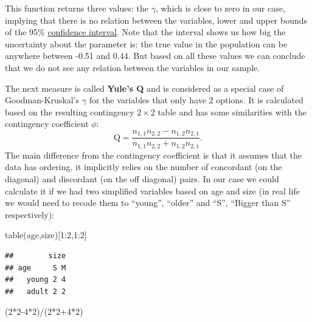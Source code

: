 \documentclass[
]{book}
\newenvironment{Shaded}{\begin{snugshade}}{\end{snugshade}}
\newcommand{\DecValTok}[1]{\textcolor[rgb]{0.00,0.00,0.81}{#1}}
\newcommand{\FunctionTok}[1]{\textcolor[rgb]{0.00,0.00,0.00}{#1}}
\newcommand{\NormalTok}[1]{#1}
\newcommand{\SpecialCharTok}[1]{\textcolor[rgb]{0.00,0.00,0.00}{#1}}
\theoremstyle{definition}
\theoremstyle{definition}
\theoremstyle{definition}
\theoremstyle{definition}
\theoremstyle{remark}
\begin{document}
This function returns three values: the \(\gamma\), which is close to zero in our case, implying that there is no relation between the variables, lower and upper bounds of the 95\% \protect\hyperlink{confidenceIntervals}{confidence interval}. Note that the interval shows us how big the uncertainty about the parameter is: the true value in the population can be anywhere between -0.51 and 0.44. But based on all these values we can conclude that we do not see any relation between the variables in our sample.

The next measure is called \textbf{Yule's Q} and is considered as a special case of Goodman-Kruskal's \(\gamma\) for the variables that only have 2 options. It is calculated based on the resulting contingency \(2\times 2\) table and has some similarities with the contingency coefficient \(\phi\):
\begin{equation}
    \mathrm{Q} = \frac{n_{1,1} n_{2,2} - n_{1,2} n_{2,1}}{n_{1,1} n_{2,2} + n_{1,2} n_{2,1}} .
    \label{eq:measuresAssociationYule}
\end{equation}
The main difference from the contingency coefficient is that it assumes that the data has ordering, it implicitly relies on the number of concordant (on the diagonal) and discordant (on the off diagonal) pairs. In our case we could calculate it if we had two simplified variables based on age and size (in real life we would need to recode them to ``young'', ``older'' and ``S'', ``Bigger than S'' respectively):

\begin{Shaded}
\begin{Highlighting}[]
\FunctionTok{table}\NormalTok{(age,size)[}\DecValTok{1}\SpecialCharTok{:}\DecValTok{2}\NormalTok{,}\DecValTok{1}\SpecialCharTok{:}\DecValTok{2}\NormalTok{]}
\end{Highlighting}
\end{Shaded}

\begin{verbatim}
##        size
## age     S M
##   young 2 4
##   adult 2 2
\end{verbatim}

\begin{Shaded}
\begin{Highlighting}[]
\NormalTok{(}\DecValTok{2}\SpecialCharTok{*}\DecValTok{2{-}4}\SpecialCharTok{*}\DecValTok{2}\NormalTok{)}\SpecialCharTok{/}\NormalTok{(}\DecValTok{2}\SpecialCharTok{*}\DecValTok{2}\SpecialCharTok{+}\DecValTok{4}\SpecialCharTok{*}\DecValTok{2}\NormalTok{)}
\end{Highlighting}
\end{Shaded}
\end{document}
